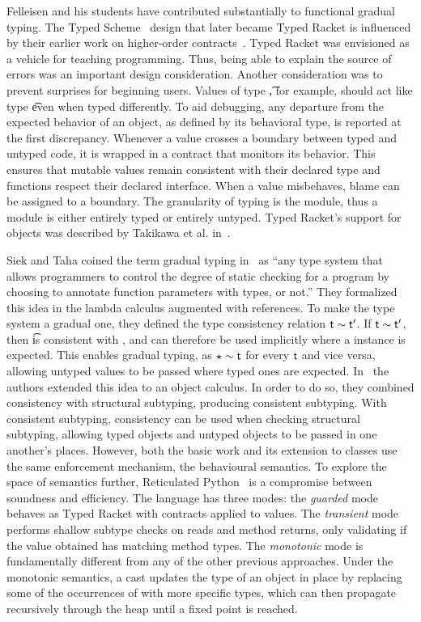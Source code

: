 \documentclass[USenglish]{tex/lipics-v2016}
\begin{document}
Felleisen and his students have contributed substantially to functional
gradual typing. The Typed Scheme~\cite{tf-popl08} design that later became
Typed Racket is influenced by their earlier work on higher-order
contracts~\cite{ff-icfp02}. Typed Racket was envisioned as a vehicle for
teaching programming. Thus, being able to explain the source of errors was
an important design consideration. Another consideration was to prevent
surprises for beginning users. Values of type \t, for example, should act
like type \t even when typed differently. To aid debugging, any departure
from the expected behavior of an object, as defined by its behavioral type,
is reported at the first discrepancy.  Whenever a value crosses a boundary
between typed and untyped code, it is wrapped in a contract that monitors
its behavior. This ensures that mutable values remain consistent with their
declared type and functions respect their declared interface. When a value
misbehaves, blame can be assigned to a boundary. The granularity of typing
is the module, thus a module is either entirely typed or entirely untyped.
Typed Racket's support for objects was described by Takikawa et
al. in~\cite{Takikawa:2012}.

Siek and Taha coined the term gradual typing in~\cite{SiekTaha06} as ``any
type system that allows programmers to control the degree of static checking
for a program by choosing to annotate function parameters with types, or
not.'' They formalized this idea in the lambda calculus augmented with
references. To make the type system a gradual one, they defined the type consistency
relation $\t \sim \tp$. If $\t \sim \tp$, then \t is consistent with \tp,
and can therefore be used implicitly where a \tp instance is expected.
This enables gradual typing, as $\any \sim \t$ for every $\t$ and vice versa,
allowing untyped values to be passed where typed ones are expected.
In~\cite{SiekTaha07} the authors extended this idea to an object calculus.
In order to do so, they combined consistency with structural subtyping,
producing consistent subtyping. With consistent subtyping, consistency can be used
when checking structural subtyping, allowing typed objects and untyped objects
to be passed in one another's places. However, both the basic work and its extension
to classes use the same enforcement mechanism, the behavioural semantics. 
To explore the space of semantics further, Reticulated Python~\cite{siek14} is a compromise between
soundness and efficiency.  The language has three modes: the \emph{guarded}
mode behaves as Typed Racket with contracts applied to values.  The
\emph{transient} mode performs shallow subtype checks on reads and method
returns, only validating if the value obtained has matching method types.
The \emph{monotonic} mode is fundamentally different from any of the other
previous approaches. Under the monotonic semantics, a cast updates the type
of an object in place by replacing some of the occurrences of \any with more
specific types, which can then propagate recursively through the heap until
a fixed point is reached.
\end{document}
